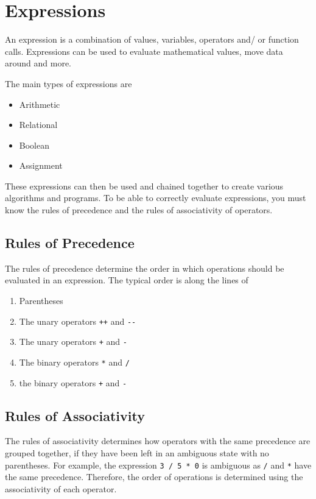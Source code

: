 
\section*{Expressions}

An expression is a combination of values, variables, operators and/ or function calls. Expressions can be used to evaluate
 mathematical values, move data around and more.

The main types of expressions are
\begin{itemize}
  \item Arithmetic
  \item Relational
  \item Boolean
  \item Assignment
\end{itemize}

These expressions can then be used and chained together to create various algorithms and programs. To be able to correctly
 evaluate expressions, you must know the rules of precedence and the rules of associativity of operators.

\subsection*{Rules of Precedence}

The rules of precedence determine the order in which operations should be evaluated in an expression. The typical order
 is along the lines of
\begin{enumerate}
  \item Parentheses
  \item The unary operators \verb`++` and \verb`--`
  \item The unary operators \verb`+` and \verb `-`
  \item The binary operators \verb`*` and \verb`/`
  \item the binary operators \verb`+` and \verb`-`
\end{enumerate}

\subsection*{Rules of Associativity}

The rules of associativity determines how operators with the same precedence are grouped together, if they have been
 left in an ambiguous state with no parentheses. For example, the expression \verb`3 / 5 * 0` is ambiguous as \verb`/`
 and \verb`*` have the same precedence. Therefore, the order of operations is determined using the associativity of each
 operator.

